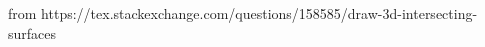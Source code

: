 \documentclass{article}
\begin{document}

%
%	
%	
%	
%	
%	
%	
%	
%	
%	



from https://tex.stackexchange.com/questions/158585/draw-3d-intersecting-surfaces
\end{document}
